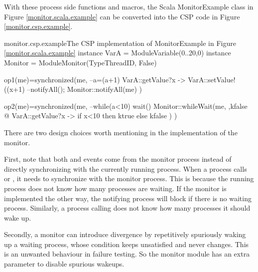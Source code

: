 \documentclass[a4paper, 12pt]{article}
\begin{document}
With these process side functions and macros, the Scala MonitorExample class in Figure \ref{monitor.scala.example} can be converted into the CSP code in Figure \ref{monitor.csp.example}.

\begin{cspfloat}{monitor.csp.example}{The CSP implementation of MonitorExample in Figure \ref{monitor.scala.example}}
instance VarA = ModuleVariable({0..20},0)
instance Monitor = ModuleMonitor(TypeThreadID, False)

op1(me)=synchronized(me,
  --a=(a+1)%
  VarA::getValue?x -> VarA::setValue!((x+1)%
  --notifyAll();
  Monitor::notifyAll(me)
)

op2(me)=synchronized(me,
  --while(a<10) wait()
  Monitor::whileWait(me, \ktrue,kfalse @
    VarA::getValue?x -> if x<10 then ktrue else kfalse
  )
)
\end{cspfloat}
  

There are two design choices worth mentioning in the implementation of the monitor. 

First, note that both  and  events come from the monitor process instead of directly synchronizing with the currently running process. When a process calls  or , it needs to synchronize with the monitor process. This is because the running process does not know how many processes are waiting. If the monitor is implemented the other way, the notifying process will block if there is no waiting process. Similarly, a process calling  does not know how many processes it should wake up. 

Secondly, a monitor can introduce divergence by repetitively spuriously waking up a waiting process, whose condition keeps unsatisfied and never changes. This is an unwanted behaviour in failure testing. So the monitor module has an extra parameter  to disable spurious wakeups. 
\end{document}
